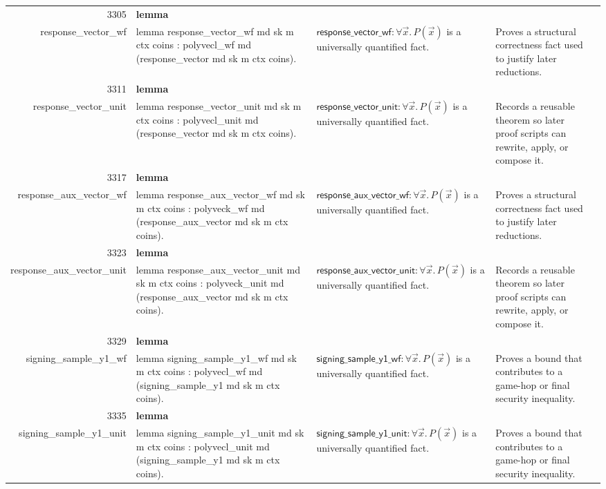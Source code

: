 \documentclass[10pt]{article}
\newcommand{\ec}[1]{\begingroup\ttfamily\scriptsize #1\endgroup}
\begin{document}
\begin{longtable}{r L{0.17\textwidth} L{0.26\textwidth} L{0.27\textwidth} L{0.20\textwidth}}
3305 & \textbf{lemma}\\\ec{response\_vector\_wf} & \ec{lemma response\_vector\_wf md sk m ctx coins : polyvecl\_wf md (response\_vector md sk m ctx coins).} & \(\mathsf{response\_vector\_wf} : \forall \vec{x}.\, P(\vec{x})\) is a universally quantified fact. & Proves a structural correctness fact used to justify later reductions. \\
3311 & \textbf{lemma}\\\ec{response\_vector\_unit} & \ec{lemma response\_vector\_unit md sk m ctx coins : polyvecl\_unit md (response\_vector md sk m ctx coins).} & \(\mathsf{response\_vector\_unit} : \forall \vec{x}.\, P(\vec{x})\) is a universally quantified fact. & Records a reusable theorem so later proof scripts can rewrite, apply, or compose it. \\
3317 & \textbf{lemma}\\\ec{response\_aux\_vector\_wf} & \ec{lemma response\_aux\_vector\_wf md sk m ctx coins : polyveck\_wf md (response\_aux\_vector md sk m ctx coins).} & \(\mathsf{response\_aux\_vector\_wf} : \forall \vec{x}.\, P(\vec{x})\) is a universally quantified fact. & Proves a structural correctness fact used to justify later reductions. \\
3323 & \textbf{lemma}\\\ec{response\_aux\_vector\_unit} & \ec{lemma response\_aux\_vector\_unit md sk m ctx coins : polyveck\_unit md (response\_aux\_vector md sk m ctx coins).} & \(\mathsf{response\_aux\_vector\_unit} : \forall \vec{x}.\, P(\vec{x})\) is a universally quantified fact. & Records a reusable theorem so later proof scripts can rewrite, apply, or compose it. \\
3329 & \textbf{lemma}\\\ec{signing\_sample\_y1\_wf} & \ec{lemma signing\_sample\_y1\_wf md sk m ctx coins : polyvecl\_wf md (signing\_sample\_y1 md sk m ctx coins).} & \(\mathsf{signing\_sample\_y1\_wf} : \forall \vec{x}.\, P(\vec{x})\) is a universally quantified fact. & Proves a bound that contributes to a game-hop or final security inequality. \\
3335 & \textbf{lemma}\\\ec{signing\_sample\_y1\_unit} & \ec{lemma signing\_sample\_y1\_unit md sk m ctx coins : polyvecl\_unit md (signing\_sample\_y1 md sk m ctx coins).} & \(\mathsf{signing\_sample\_y1\_unit} : \forall \vec{x}.\, P(\vec{x})\) is a universally quantified fact. & Proves a bound that contributes to a game-hop or final security inequality. \\

\end{longtable}
\end{document}
